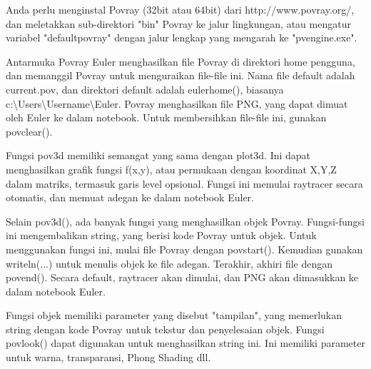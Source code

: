 \documentclass[12pt,arial,letterpaper]{book}
\begin{document}
\begin{eulercomment}
\begin{eulercomment}
\begin{eulercomment}
\begin{eulercomment}
\begin{eulercomment}
\begin{eulercomment}
\begin{eulercomment}
\begin{eulercomment}
\begin{eulercomment}
\begin{eulercomment}
\begin{eulercomment}
\begin{eulercomment}
\begin{eulercomment}
\begin{eulercomment}
\begin{eulercomment}
\begin{eulercomment}
\begin{eulercomment}
\begin{eulercomment}
\begin{eulercomment}
Anda perlu menginstal Povray (32bit atau 64bit) dari
http://www.povray.org/, dan meletakkan sub-direktori "bin" Povray ke jalur lingkungan, atau mengatur variabel "defaultpovray" dengan jalur lengkap yang mengarah ke "pvengine.exe".


Antarmuka Povray Euler menghasilkan file Povray di direktori home
pengguna, dan memanggil Povray untuk menguraikan file-file ini. Nama
file default adalah current.pov, dan direktori default adalah
eulerhome(), biasanya c:\textbackslash{}Users\textbackslash{}Username\textbackslash{}Euler. Povray menghasilkan
file PNG, yang dapat dimuat oleh Euler ke dalam notebook. Untuk
membersihkan file-file ini, gunakan povclear().


Fungsi pov3d memiliki semangat yang sama dengan plot3d. Ini dapat
menghasilkan grafik fungsi f(x,y), atau permukaan dengan koordinat
X,Y,Z dalam matriks, termasuk garis level opsional. Fungsi ini memulai
raytracer secara otomatis, dan memuat adegan ke dalam notebook Euler.


Selain pov3d(), ada banyak fungsi yang menghasilkan objek Povray.
Fungsi-fungsi ini mengembalikan string, yang berisi kode Povray untuk
objek. Untuk menggunakan fungsi ini, mulai file Povray dengan
povstart(). Kemudian gunakan writeln(...) untuk menulis objek ke file
adegan. Terakhir, akhiri file dengan povend(). Secara default,
raytracer akan dimulai, dan PNG akan dimasukkan ke dalam notebook
Euler.

Fungsi objek memiliki parameter yang disebut "tampilan", yang
memerlukan string dengan kode Povray untuk tekstur dan penyelesaian
objek. Fungsi povlook() dapat digunakan untuk menghasilkan string ini.
Ini memiliki parameter untuk warna, transparansi, Phong Shading dll.



\end{eulercomment}
\end{eulercomment}
\end{eulercomment}
\end{eulercomment}
\end{eulercomment}
\end{eulercomment}
\end{eulercomment}
\end{eulercomment}
\end{eulercomment}
\end{eulercomment}
\end{eulercomment}
\end{eulercomment}
\end{eulercomment}
\end{eulercomment}
\end{eulercomment}
\end{eulercomment}
\end{eulercomment}
\end{eulercomment}
\end{eulercomment}
\end{document}
